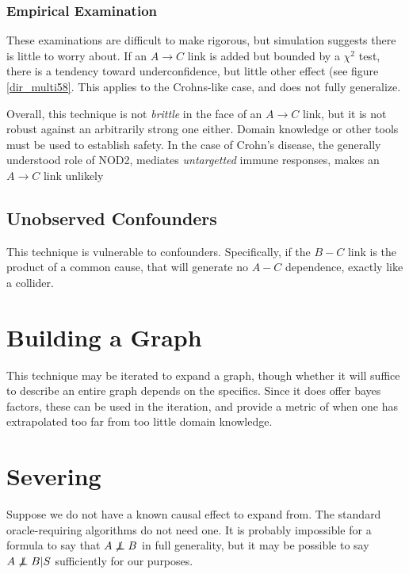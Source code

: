 \documentclass[twocolumn,12pt]{article}
\newcommand\indep{\protect\mathpalette{\protect\independenT}{\perp}}
\def\independenT#1#2{\mathrel{\rlap{$#1#2$}\mkern2mu{#1#2}}}
\begin{document}
\subsubsection{Empirical Examination}

These examinations are difficult to make rigorous, but simulation
suggests there is little to worry about.  If an $A\rightarrow C$ link
is added but bounded by a $\chi^2$ test, there is a tendency toward
underconfidence, but little other effect (see figure
\ref{dir_multi58}.  This applies to the Crohns-like case, and does not
fully generalize.

Overall, this technique is not \textit{brittle} in the face of an
$A \rightarrow C$ link, but it is not robust against an arbitrarily
strong one either.  Domain knowledge or other tools must be used to
establish safety.  In the case of Crohn's disease, the generally
understood role of NOD2, mediates \textit{untargetted} immune
responses,\cite{nod2} makes an $A\rightarrow C$ link unlikely

\subsection{Unobserved Confounders}

This technique is vulnerable to confounders.  Specifically, if the
$B-C$ link is the product of a common cause, that will generate no
$A-C$ dependence, exactly like a collider.

\section{Building a Graph}

This technique may be iterated to expand a graph, though whether it
will suffice to describe an entire graph depends on the specifics.
Since it does offer bayes factors, these can be used in the iteration,
and provide a metric of when one has extrapolated too far from too
little domain knowledge.

\section{Severing}

Suppose we do not have a known causal effect to expand from.  The
standard oracle-requiring algorithms do not need one.  It is probably
impossible for a formula to say that $A\not\indep B$ in full
generality, but it may be possible to say $A\not\indep B|S$
sufficiently for our purposes.
\end{document}

